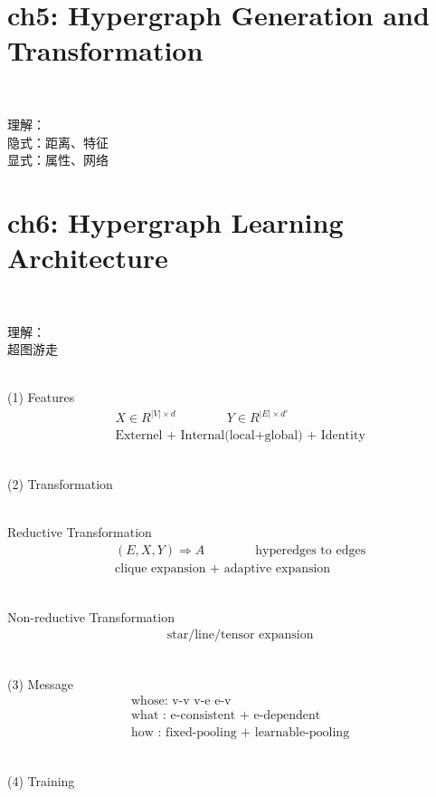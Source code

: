 \documentclass{article}
\begin{document}
\newpage
\section*{ch5: Hypergraph Generation and Transformation}


~ \\[3pt]
\begin{CJK}{UTF8}{gbsn}
    理解： \\[3pt]
        隐式：距离、特征  \\[3pt]
        显式：属性、网络  \\[3pt]
\end{CJK}


\newpage
\section*{ch6: Hypergraph Learning Architecture}


~ \\[3pt]
\begin{CJK}{UTF8}{gbsn}
    理解： \\[3pt]
        超图游走  \\[3pt]
\end{CJK}


~ \\[3pt]
(1) Features
\begin{align*}
    & X \in R^{ |V| \times d } \qquad \qquad Y \in R^{ |E| \times d'} \\[3pt]
    & \text{Externel + Internal(local+global) + Identity}
\end{align*}


~ \\[3pt]
(2) Transformation

~ \\[3pt]
Reductive Transformation
\begin{align*}
    & ( E, X, Y ) \Rightarrow A 
    \qquad \qquad 
    \text{hyperedges to edges} \\[3pt]
    & \text{clique expansion + adaptive expansion}
\end{align*}

~ \\[3pt]
Non-reductive Transformation
\begin{align*}
    & \text{star/line/tensor expansion}
\end{align*}


~ \\[3pt]
(3) Message
\begin{align*}
    & \text{whose: v-v \ v-e \ e-v} \\[3pt]
    & \text{what : e-consistent + e-dependent} \\[3pt]
    & \text{how  : fixed-pooling + learnable-pooling} 
\end{align*}


~ \\[3pt]
(4) Training
\end{document}
